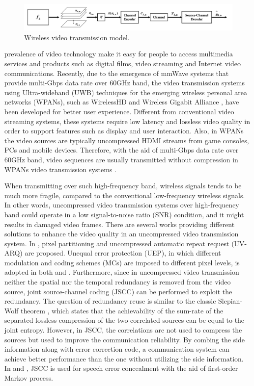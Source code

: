 \documentclass[10pt,twocolumn,twoside]{IEEEtran}
\begin{document}
\begin{figure}[!t]
	\centering
	\includegraphics[width=\textwidth]{sm.pdf}
	\caption{Wireless video transmission model.}
\label{trans_model}
\end{figure}

  prevalence of video technology make it easy for people to access multimedia services and products such as digital films, video streaming and Internet video communications. Recently, due to the emergence of mmWave systems that provide multi-Gbps data rate over 60GHz band, the video transmission systems using Ultra-wideband (UWB) techniques for the emerging wireless personal area networks (WPANs), such as WirelessHD \cite{WirelessHD} and Wireless Gigabit Alliance \cite{Wigig}, have been developed for better user experience. Different from conventional video streaming systems, these systems require low latency and lossless video quality in order to support features such as display and user interaction. Also, in WPANs the video sources are typically uncompressed HDMI streams from game consoles, PCs and mobile devices. Therefore, with the aid of multi-Gbps data rate over 60GHz band, video sequences are usually transmitted without compression in WPANs video transmission systems \cite{60ghz}.

When transmitting over such high-frequency band, wireless signals tends to be much more fragile, compared to the conventional low-frequency wireless signals. In other words, uncompressed video transmission systems over high-frequency band could operate in a low signal-to-noise ratio (SNR) condition, and it might results in damaged video frames. There are several works providing different solutions to enhance the video quality in an uncompressed video transmission system. In \cite{60ghz}, pixel partitioning and uncompressed automatic repeat request (UV-ARQ) are proposed. Unequal error protection (UEP), in which different modulation and coding schemes (MCs) are imposed to different pixel levels, is adopted in both \cite{60ghz} and \cite{ucp_v}. Furthermore, since in uncompressed video transmission neither the spatial nor the temporal redundancy is removed from the video source, joint source-channel coding (JSCC) \cite{JSCC} can be performed to exploit the redundancy. The question of redundancy reuse is similar to the classic Slepian-Wolf theorem \cite{sw}, which states that the achievability of the sum-rate of the separated lossless compression of the two correlated sources can be equal to the joint entropy. However, in JSCC, the correlations are not used to compress the sources but used to improve the communication reliability. By combing the side information along with error correction code, a communication system can achieve better performance than the one without utilizing the side information. In \cite{JSCC_SCCD} and \cite{softbit}, JSCC is used for speech error concealment with the aid of first-order Markov process. 
\end{document}
